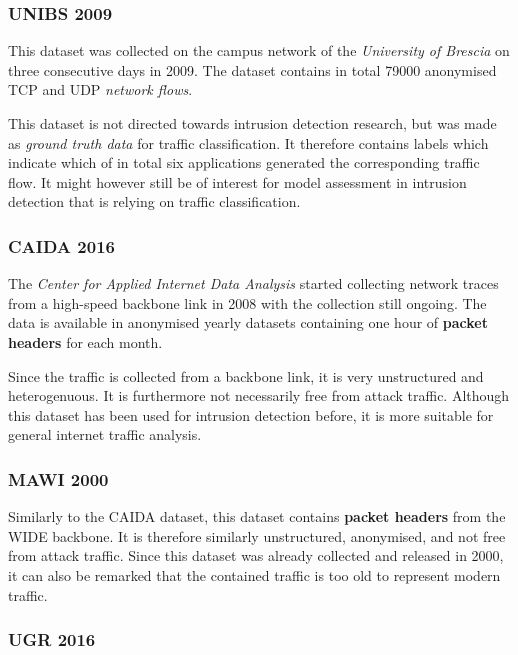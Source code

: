 \subsubsection*{UNIBS 2009\cite{UNIBS2009data}}

This dataset was collected on the campus network of the \textit{University of Brescia} on three consecutive days in 2009. The dataset contains in total 79000 anonymised TCP and UDP \textit{network flows}. 

This dataset is not directed towards intrusion detection research, but was made as \textit{ground truth data} for traffic classification. It therefore contains labels which indicate which of in total six applications generated the corresponding traffic flow. It might however still be of interest for model assessment in intrusion detection that is relying on traffic classification.

\subsubsection*{CAIDA 2016 \cite{walsworth2015caida}}

The \textit{Center for Applied Internet Data Analysis} started collecting network traces from a high-speed backbone link in 2008 with the collection still ongoing. The data is available in anonymised yearly datasets containing one hour of \textbf{packet headers} for each month. 

Since the traffic is collected from a backbone link, it is very unstructured and heterogenuous. It is furthermore not necessarily free from attack traffic. Although this dataset has been used for intrusion detection before, it is more suitable for general internet traffic analysis.


\subsubsection*{MAWI 2000 \cite{sony2000traffic}}

Similarly to the CAIDA dataset, this dataset contains \textbf{packet headers} from the WIDE backbone. It is therefore similarly unstructured, anonymised, and not free from attack traffic. Since this dataset was already collected and released in 2000, it can also be remarked that the contained traffic is too old to represent modern traffic. 


\subsubsection*{UGR 2016 \cite{macia2018ugr}}

